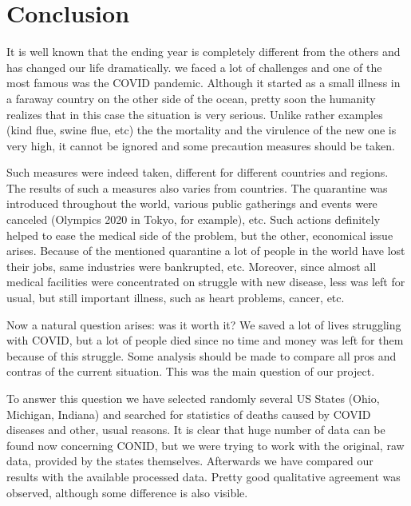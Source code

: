 \documentclass[conference]{IEEEtran}
\begin{document}



\section{Conclusion}

It is well known that the ending year is completely different from the others and has changed our life dramatically. we faced a lot of challenges and one of the most famous was the COVID pandemic. Although it started as a small illness in a faraway country on the other side of the ocean, pretty soon the humanity realizes that in this case the situation is very serious. Unlike rather examples (kind flue, swine flue, etc) the the mortality and the virulence of the new one is very high, it cannot be ignored and some precaution measures should be taken.

Such measures were indeed taken, different for different countries and regions. The results of such a measures also varies from countries. The quarantine was introduced throughout the world, various public gatherings and events were canceled (Olympics 2020 in Tokyo, for example), etc. Such actions definitely helped to ease the medical side of the problem, but the other, economical issue arises. Because of the mentioned quarantine a lot of people in the world have lost their jobs, same industries were bankrupted, etc. Moreover, since almost all medical facilities were concentrated on struggle with new disease, less was left for usual, but still important illness, such as heart problems, cancer, etc.

Now a natural question arises: was it worth it? We saved a lot of lives struggling with COVID, but a lot of people died since no time and money was left for them because of this struggle. Some analysis should be made to compare all pros and contras of the current situation. This was the main question of our project.

To answer this question we have selected randomly several US States (Ohio, Michigan, Indiana) and searched for statistics of deaths caused by COVID diseases and other, usual reasons. It is clear that huge number of data can be found now concerning CONID, but we were trying to work with the original, raw data, provided by the states themselves. Afterwards we have compared our results with the available processed data. Pretty good qualitative agreement  was observed, although some difference is also visible.
\end{document}
